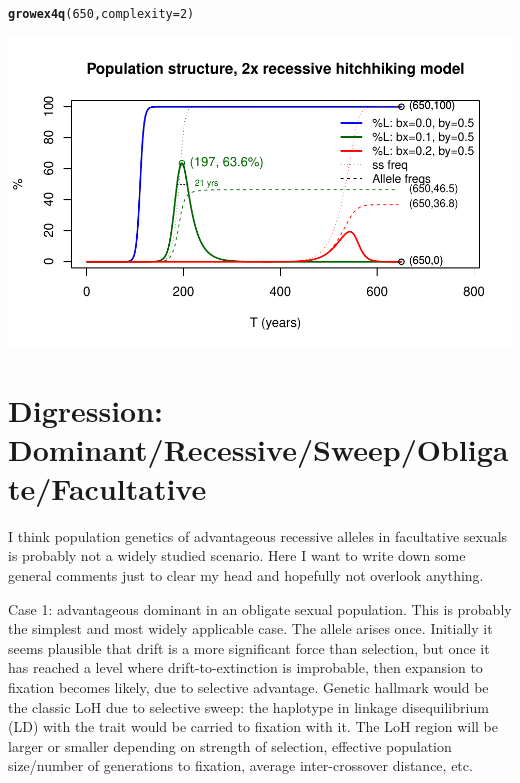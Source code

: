 \documentclass{article}\usepackage[]{graphicx}\usepackage[]{color}
\makeatletter
\def\maxwidth{ %
  \ifdim\Gin@nat@width>\linewidth
    \linewidth
  \else
    \Gin@nat@width
  \fi
}
\newcommand{\hlnum}[1]{\textcolor[rgb]{0.686,0.059,0.569}{#1}}%
\newcommand{\hlstd}[1]{\textcolor[rgb]{0.345,0.345,0.345}{#1}}%
\newcommand{\hlkwc}[1]{\textcolor[rgb]{0.333,0.667,0.333}{#1}}%
\newcommand{\hlkwd}[1]{\textcolor[rgb]{0.737,0.353,0.396}{\textbf{#1}}}%
\newenvironment{kframe}{%
 \def\at@end@of@kframe{}%
 \ifinner\ifhmode%
  \def\at@end@of@kframe{\end{minipage}}%
  \begin{minipage}{\columnwidth}%
 \fi\fi%
 \def\FrameCommand##1{\hskip\@totalleftmargin \hskip-\fboxsep
 \colorbox{shadecolor}{##1}\hskip-\fboxsep
     \hskip-\linewidth \hskip-\@totalleftmargin \hskip\columnwidth}%
 \MakeFramed {\advance\hsize-\width
   \@totalleftmargin\z@ \linewidth\hsize
   \@setminipage}}%
 {\par\unskip\endMakeFramed%
 \at@end@of@kframe}
\newenvironment{knitrout}{}{} %
\makeatother
\begin{document}
\begin{knitrout}\footnotesize
{}\color{fgcolor}\begin{kframe}
\begin{alltt}
\hlkwd{growex4q}\hlstd{(}\hlnum{650}\hlstd{,}\hlkwc{complexity}\hlstd{=}\hlnum{2}\hlstd{)}
\end{alltt}
\end{kframe}

{\centering \includegraphics[width=\maxwidth]{asex-figs-knitr/recessive-x2-hitch-1} 

}



\end{knitrout}

\section{Digression: Dominant/Recessive/Sweep/Obligate/Facultative}

I think population genetics of advantageous recessive alleles in facultative sexuals is probably not
a widely studied scenario.  Here I want to write down some general comments just to clear my head
and hopefully not overlook anything.

Case 1: advantageous dominant in an obligate sexual population.  This is probably the simplest and
most widely applicable case.  The allele arises once.  Initially it seems plausible that drift is a
more significant force than selection, but once it has reached a level where drift-to-extinction is
improbable, then expansion to fixation becomes likely, due to selective advantage.  Genetic hallmark
would be the classic LoH due to selective sweep: the haplotype in linkage disequilibrium (LD) with
the trait would be carried to fixation with it.  The LoH region will be larger or smaller depending
on strength of selection, effective population size/number of generations to fixation, average
inter-crossover distance, etc.
\end{document}
